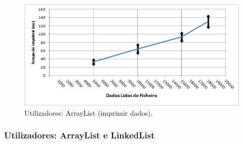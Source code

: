 \documentclass[a5paper,twocolumn, 11pt]{article}
\begin{document}
\begin{figure}[h!b!t!]
    \caption[Utilizadores: ArrayList (imprimir dados)]{Utilizadores: ArrayList (imprimir dados).}
    \label{hashtable}
    \centering
        \includegraphics[width=400pt]{user_c1_o5.png}
\end{figure}

\newpage
\twocolumn
\subsubsection[Utilizadores:\\ArrayList e LinkedList]{Utilizadores: \vbox{ArrayList e LinkedList}}
\end{document}
